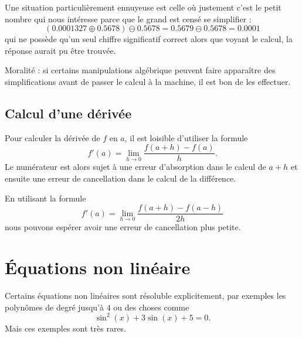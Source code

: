 Une situation particulièrement ennuyeuse est celle où justement c'est le petit nombre qui nous intéresse parce que le grand est censé se simplifier : 
\begin{equation}
    (0.0001327\oplus 0.5678)\ominus 0.5678=0.5679\ominus 0.5678=0.0001
\end{equation}
qui ne possède qu'un seul chiffre significatif correct alors que voyant le calcul, la réponse aurait pu être trouvée.

Moralité : si certains manipulations algébrique peuvent faire apparaître des simplifications avant de passer le calcul à la machine, il est bon de les effectuer.

\subsection{Calcul d'une dérivée}

Pour calculer la dérivée de \( f\) en \( a\), il est loisible d'utiliser la formule
\begin{equation}
    f'(a)=\lim_{h\to 0} \frac{ f(a+h)-f(a) }{ h }.
\end{equation}
Le numérateur est alors sujet à une erreur d'absorption dans le calcul de \( a+h\) et ensuite une erreur de cancellation dans le calcul de la différence.

En utilisant la formule
\begin{equation}
    f'(a)=\lim_{h\to 0} \frac{ f(a+h)-f(a-h) }{ 2h }
\end{equation}
nous pouvons espérer avoir une erreur de cancellation plus petite.

\section{Équations non linéaire}

Certains équations non linéaires sont résoluble explicitement, par exemples les polynômes de degré jusqu'à \( 4\) ou des choses comme
\begin{equation}
	\sin^2(x)+3\sin(x)+5=0.
\end{equation}
Mais ces exemples sont très rares.

